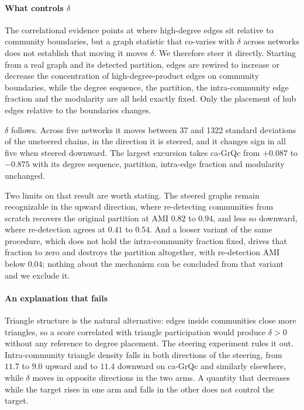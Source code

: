 \paragraph{What controls $\delta$}
The correlational evidence points at where high-degree edges sit relative to
community boundaries, but a graph statistic that co-varies with $\delta$ across
networks does not establish that moving it moves $\delta$. We therefore steer it
directly. Starting from a real graph and its detected partition, edges are
rewired to increase or decrease the concentration of high-degree-product edges on
community boundaries, while the degree sequence, the partition, the
intra-community edge fraction and the modularity are all held exactly fixed. Only
the placement of hub edges relative to the boundaries changes.

$\delta$ follows. Across five networks it moves between 37 and 1322 standard
deviations of the unsteered chains, in the direction it is steered, and it
changes sign in all five when steered downward. The largest excursion takes
ca-GrQc from $+0.087$ to $-0.875$ with its degree sequence, partition,
intra-edge fraction and modularity unchanged.

Two limits on that result are worth stating. The steered graphs remain
recognizable in the upward direction, where re-detecting communities from scratch
recovers the original partition at AMI $0.82$ to $0.94$, and less so downward,
where re-detection agrees at $0.41$ to $0.54$. And a looser variant of the same
procedure, which does not hold the intra-community fraction fixed, drives that
fraction to zero and destroys the partition altogether, with re-detection AMI
below $0.04$; nothing about the mechanism can be concluded from that variant and
we exclude it.

\paragraph{An explanation that fails}
Triangle structure is the natural alternative: edges inside communities close more
triangles, so a score correlated with triangle participation would produce
$\delta > 0$ without any reference to degree placement. The steering experiment
rules it out. Intra-community triangle density falls in both directions of the
steering, from $11.7$ to $9.0$ upward and to $11.4$ downward on ca-GrQc and
similarly elsewhere, while $\delta$ moves in opposite directions in the two arms.
A quantity that decreases while the target rises in one arm and falls in the
other does not control the target.

